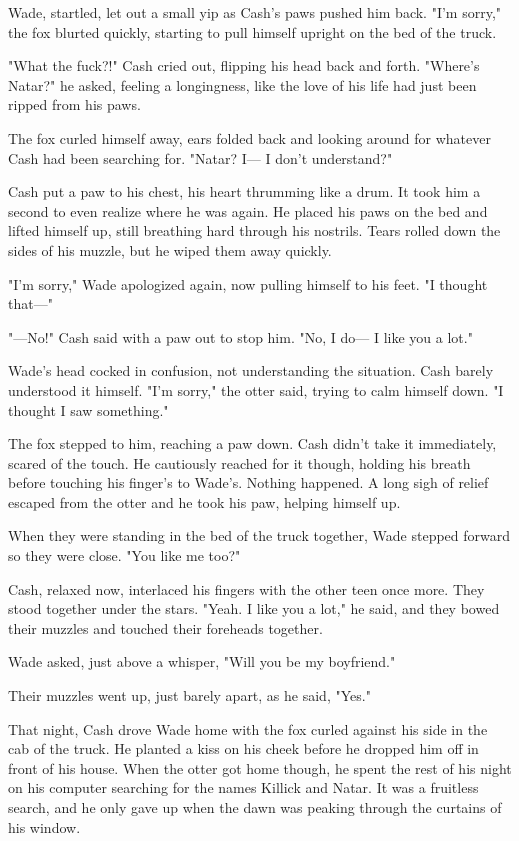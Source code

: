 Wade, startled, let out a small yip as Cash's paws pushed him back. "I'm sorry," the fox blurted quickly, starting to pull himself upright on the bed of the truck.

"What the fuck?!" Cash cried out, flipping his head back and forth. "Where's Natar?" he asked, feeling a longingness, like the love of his life had just been ripped from his paws.

The fox curled himself away, ears folded back and looking around for whatever Cash had been searching for. "Natar? I--- I don't understand?"

Cash put a paw to his chest, his heart thrumming like a drum. It took him a second to even realize where he was again. He placed his paws on the bed and lifted himself up, still breathing hard through his nostrils. Tears rolled down the sides of his muzzle, but he wiped them away quickly.

"I'm sorry," Wade apologized again, now pulling himself to his feet. "I thought that---"

"---No!" Cash said with a paw out to stop him. "No, I do--- I like you a lot."

Wade's head cocked in confusion, not understanding the situation. Cash barely understood it himself. "I'm sorry," the otter said, trying to calm himself down. "I thought I saw something."

The fox stepped to him, reaching a paw down. Cash didn't take it immediately, scared of the touch. He cautiously reached for it though, holding his breath before touching his finger's to Wade's. Nothing happened. A long sigh of relief escaped from the otter and he took his paw, helping himself up.

When they were standing in the bed of the truck together, Wade stepped forward so they were close. "You like me too?"

Cash, relaxed now, interlaced his fingers with the other teen once more. They stood together under the stars. "Yeah. I like you a lot," he said, and they bowed their muzzles and touched their foreheads together.

Wade asked, just above a whisper, "Will you be my boyfriend."

Their muzzles went up, just barely apart, as he said, "Yes."

That night, Cash drove Wade home with the fox curled against his side in the cab of the truck. He planted a kiss on his cheek before he dropped him off in front of his house. When the otter got home though, he spent the rest of his night on his computer searching for the names Killick and Natar. It was a fruitless search, and he only gave up when the dawn was peaking through the curtains of his window.

